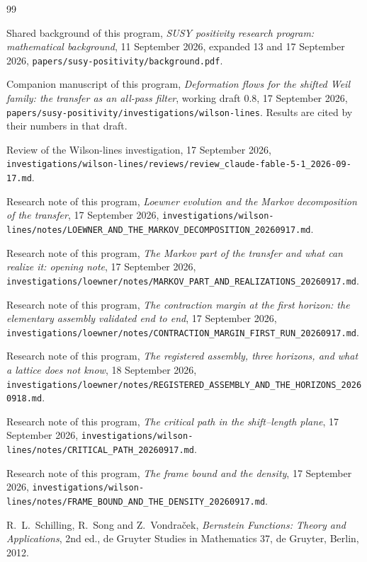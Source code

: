 \begin{thebibliography}{99}
\raggedright
{}
Shared background of this program, \emph{SUSY positivity research program:
mathematical background}, 11 September 2026, expanded 13 and 17 September 2026,
\texttt{papers/susy-positivity/background.pdf}.

Companion manuscript of this program, \emph{Deformation flows for the shifted
Weil family: the transfer as an all-pass filter}, working draft 0.8,
17 September 2026,
\texttt{papers/susy-positivity/investigations/wilson-lines}. Results are cited
by their numbers in that draft.

Review of the Wilson-lines investigation, 17 September 2026,
\texttt{investigations/wilson-lines/reviews/\allowbreak review\_claude-fable-5-1\_2026-09-17.md}.

Research note of this program, \emph{Loewner evolution and the Markov
decomposition of the transfer}, 17 September 2026,
\texttt{investigations/wilson-lines/notes/\allowbreak LOEWNER\_AND\_THE\_MARKOV\_DECOMPOSITION\_20260917.md}.

Research note of this program, \emph{The Markov part of the transfer and what
can realize it: opening note}, 17 September 2026,
\texttt{investigations/loewner/notes/\allowbreak MARKOV\_PART\_AND\_REALIZATIONS\_20260917.md}.

Research note of this program, \emph{The contraction margin at the first
horizon: the elementary assembly validated end to end}, 17 September 2026,
\texttt{investigations/loewner/notes/\allowbreak CONTRACTION\_MARGIN\_FIRST\_RUN\_20260917.md}.

Research note of this program, \emph{The registered assembly, three horizons,
and what a lattice does not know}, 18 September 2026,
\texttt{investigations/loewner/notes/\allowbreak REGISTERED\_ASSEMBLY\_AND\_THE\_HORIZONS\_20260918.md}.

Research note of this program, \emph{The critical path in the shift--length
plane}, 17 September 2026,
\texttt{investigations/wilson-lines/notes/CRITICAL\_PATH\_20260917.md}.

Research note of this program, \emph{The frame bound and the density},
17 September 2026,
\texttt{investigations/wilson-lines/notes/\allowbreak FRAME\_BOUND\_AND\_THE\_DENSITY\_20260917.md}.

R.~L.~Schilling, R.~Song and Z.~Vondra\v{c}ek, \emph{Bernstein Functions:
Theory and Applications}, 2nd ed., de Gruyter Studies in Mathematics 37,
de Gruyter, Berlin, 2012.


\end{thebibliography}
